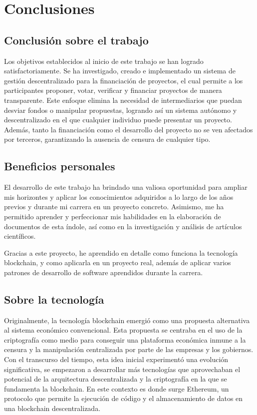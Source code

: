 \section{Conclusiones}
\subsection{Conclusión sobre el trabajo}

Los objetivos establecidos al inicio de este trabajo se han logrado satisfactoriamente. Se ha investigado, creado e implementado un sistema de gestión descentralizado para la financiación de proyectos, el cual permite a los participantes proponer, votar, verificar y financiar proyectos de manera transparente. Este enfoque elimina la necesidad de intermediarios que puedan desviar fondos o manipular propuestas, logrando así un sistema autónomo y descentralizado en el que cualquier individuo puede presentar un proyecto. Además, tanto la financiación como el desarrollo del proyecto no se ven afectados por terceros, garantizando la ausencia de censura de cualquier tipo.


\subsection{Beneficios personales}

El desarrollo de este trabajo ha brindado una valiosa oportunidad para ampliar mis horizontes y aplicar los conocimientos adquiridos a lo largo de los años previos y durante mi carrera en un proyecto concreto. Asimismo, me ha permitido aprender y perfeccionar mis habilidades en la elaboración de documentos de esta índole, así como en la investigación y análisis de artículos científicos.

\bigskip

Gracias a este proyecto, he aprendido en detalle como funciona la tecnología blockchain, y como aplicarla en un proyecto real, además de aplicar varios patrones de desarrollo de software aprendidos durante la carrera.

\subsection{Sobre la tecnología}

Originalmente, la tecnología blockchain emergió como una propuesta alternativa al sistema económico convencional. Esta propuesta se centraba en el uso de la criptografía como medio para conseguir una plataforma económica inmune a la censura y la manipulación centralizada por parte de las empresas y los gobiernos. Con el transcurso del tiempo, esta idea inicial experimentó una evolución significativa, se empezaron a desarrollar más tecnologías que aprovechaban el potencial de la arquitectura descentralizada y la criptografía en la que se fundamenta la blockchain. En este contexto es donde surge Ethereum, un protocolo que permite la ejecución de código y el almacenamiento de datos en una blockchain descentralizada.

